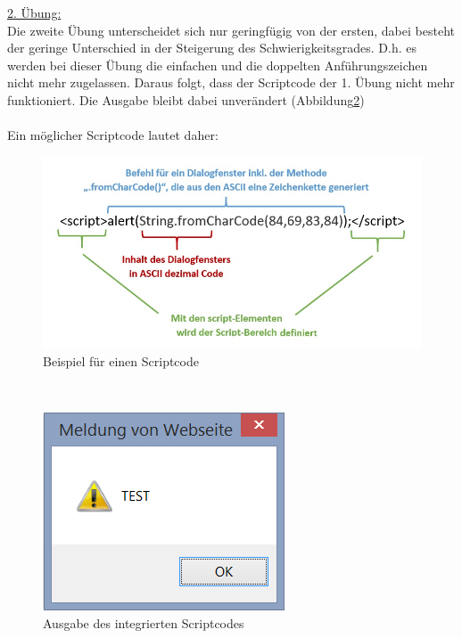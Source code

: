 \newpage

\underline{2. Übung:}
\\
Die zweite Übung unterscheidet sich nur geringfügig von der ersten, dabei besteht der geringe Unterschied in der Steigerung des Schwierigkeitsgrades. D.h. es werden bei dieser Übung die einfachen und die doppelten Anführungszeichen nicht mehr zugelassen.
Daraus folgt, dass der Scriptcode der 1. Übung nicht mehr funktioniert. Die Ausgabe bleibt dabei unverändert (Abbildung\ref{fig:xss-reflected-DialogfensterII})
\\
\\
Ein möglicher Scriptcode lautet daher: 

\begin{figure}[h]
	\centering
	\includegraphics[scale = 0.4]{images/XSS/ScriptcodeII.jpg}
	\caption{Beispiel für einen Scriptcode}
	\label{fig:xss-reflected-ScriptcodeII}
\end{figure}

\ \\

\begin{figure}[h]
	\centering
	\includegraphics[scale = 0.4]{images/XSS/alert_meldung.jpg}
	\caption{Ausgabe des integrierten Scriptcodes}
	\label{fig:xss-reflected-DialogfensterII}
\end{figure}

